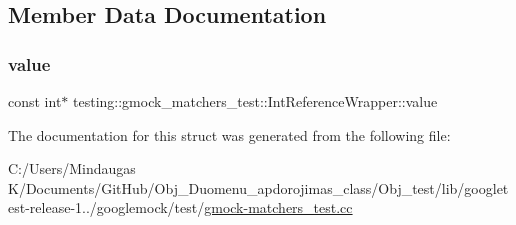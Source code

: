 \subsection{Member Data Documentation}
\mbox{\label{structtesting_1_1gmock__matchers__test_1_1_int_reference_wrapper_ac8fcb05733aa1fdb6c5236731b236cf6}} 
\subsubsection{\texorpdfstring{value}{value}}
{\footnotesize\ttfamily const int$\ast$ testing\+::gmock\+\_\+matchers\+\_\+test\+::\+Int\+Reference\+Wrapper\+::value}



The documentation for this struct was generated from the following file\+:\begin{DoxyCompactItemize}
\item 
C\+:/\+Users/\+Mindaugas K/\+Documents/\+Git\+Hub/\+Obj\+\_\+\+Duomenu\+\_\+apdorojimas\+\_\+class/\+Obj\+\_\+test/lib/googletest-\/release-\/1../googlemock/test/\mbox{\hyperlink{_obj__test_2lib_2googletest-release-1_88_81_2googlemock_2test_2gmock-matchers__test_8cc}{gmock-\/matchers\+\_\+test.\+cc}}\end{DoxyCompactItemize}
